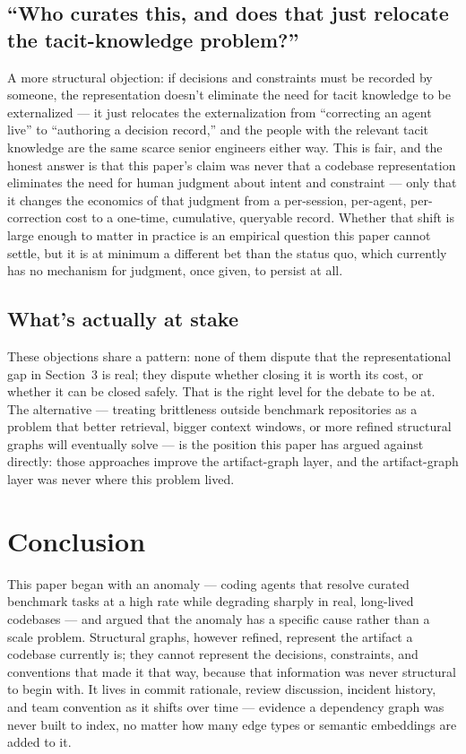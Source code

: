 \documentclass[11pt]{article}
\begin{document}
\subsection{``Who curates this, and does that just relocate the tacit-knowledge problem?''}

A more structural objection: if decisions and constraints must be recorded by someone, the representation doesn't eliminate the need for tacit knowledge to be externalized --- it just relocates the externalization from ``correcting an agent live'' to ``authoring a decision record,'' and the people with the relevant tacit knowledge are the same scarce senior engineers either way. This is fair, and the honest answer is that this paper's claim was never that a codebase representation eliminates the need for human judgment about intent and constraint --- only that it changes the economics of that judgment from a per-session, per-agent, per-correction cost to a one-time, cumulative, queryable record. Whether that shift is large enough to matter in practice is an empirical question this paper cannot settle, but it is at minimum a different bet than the status quo, which currently has no mechanism for judgment, once given, to persist at all.

\subsection{What's actually at stake}

These objections share a pattern: none of them dispute that the representational gap in Section~3 is real; they dispute whether closing it is worth its cost, or whether it can be closed safely. That is the right level for the debate to be at. The alternative --- treating brittleness outside benchmark repositories as a problem that better retrieval, bigger context windows, or more refined structural graphs will eventually solve --- is the position this paper has argued against directly: those approaches improve the artifact-graph layer, and the artifact-graph layer was never where this problem lived.

\section{Conclusion}

This paper began with an anomaly --- coding agents that resolve curated benchmark tasks at a high rate while degrading sharply in real, long-lived codebases --- and argued that the anomaly has a specific cause rather than a scale problem. Structural graphs, however refined, represent the artifact a codebase currently is; they cannot represent the decisions, constraints, and conventions that made it that way, because that information was never structural to begin with. It lives in commit rationale, review discussion, incident history, and team convention as it shifts over time --- evidence a dependency graph was never built to index, no matter how many edge types or semantic embeddings are added to it.
\end{document}
